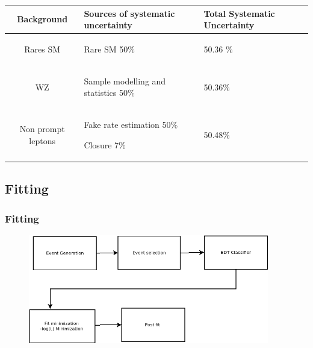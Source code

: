 \documentclass[11pt]{beamer}
\begin{document}
\begin{frame}
\begin{table}
		\renewcommand{\arraystretch}{0.1}
	\begin{tabular}{|c|M{2.7cm}|M{2.3cm}|}
\hline
\scriptsize{Background}& \scriptsize{Sources of systematic uncertainty}& \scriptsize{Total Systematic Uncertainty} \\
		\hline
	 \tiny{Rares SM} & {\begin{itemize} \tiny{
				\item Rare SM 50$\%$ }
	\end{itemize}}&50.36 $\%$ \\
	\hline
	\tiny{WZ} & {\begin{itemize}\tiny{
				\item Sample modelling and statistics 50$\%$ }
	\end{itemize}} & 50.36$\%$ \\
	\hline 
	\tiny{Non prompt leptons} &{\begin{itemize} \tiny{
				\item Fake rate estimation 50$\%$
				\item Closure 7$\%$ }
	\end{itemize}} 		 & 50.48$\%$ \\
	\hline 
	\end{tabular}
\end{table}

\end{frame}




\begin{frame}
\section{Fitting}
\frametitle{Fitting}
	\begin{center}
	\begin{figure}
		\includegraphics[width=10.5cm]{figures/fit-box.png}
		\caption*{}
	\end{figure}
\end{center}
\end{frame}
\end{document}

